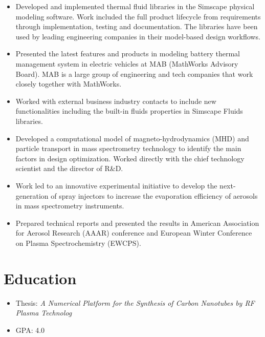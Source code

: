 \documentclass[11pt,a4paper,sans]{moderncv}
\begin{document}
{ \begin{itemize} \itemsep -1pt
  \item Developed and implemented thermal fluid libraries in the Simscape physical modeling software. Work included the full product lifecycle from requirements through implementation, testing and documentation. The libraries have been used by leading engineering companies in their model-based design workflows. 
  \item Presented the latest features and products in modeling battery thermal management system in electric vehicles at MAB (MathWorks Advisory Board). MAB is a large group of engineering and tech companies that work closely together with MathWorks.
  \item Worked with external business industry contacts to include new functionalities including the built-in fluids properties in Simscape Fluids libraries.
\end{itemize} }

{ \begin{itemize} \itemsep -1pt
  \item Developed a computational model of magneto-hydrodynamics (MHD) and particle transport in mass spectrometry technology to identify the main factors in design optimization. Worked directly with the chief technology scientist and the director of R\&D.
  \item Work led to an innovative experimental initiative to develop the next-generation of spray injectors
to increase the evaporation efficiency of aerosols in mass spectrometry instruments.
  \item Prepared technical reports and presented the results in American Association for Aerosol Research (AAAR) conference and European Winter Conference on Plasma Spectrochemistry (EWCPS).
\end{itemize} }

\section{\textbf{Education}}

{ \begin{itemize} \itemsep -1pt
  \item Thesis: \textit{A Numerical Platform for the Synthesis of Carbon Nanotubes by RF Plasma Technolog}\item GPA: 4.0
\end{itemize} }
\end{document}
